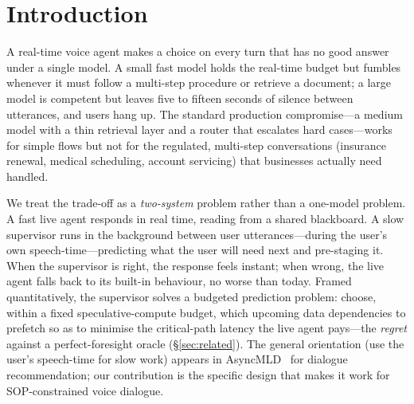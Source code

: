 \documentclass[10pt,twocolumn]{article}
\begin{document}
\section{Introduction}

A real-time voice agent makes a choice on every turn that has no good answer under a single model. A small fast model holds the real-time budget but fumbles whenever it must follow a multi-step procedure or retrieve a document; a large model is competent but leaves five to fifteen seconds of silence between utterances, and users hang up. The standard production compromise---a medium model with a thin retrieval layer and a router that escalates hard cases---works for simple flows but not for the regulated, multi-step conversations (insurance renewal, medical scheduling, account servicing) that businesses actually need handled.

We treat the trade-off as a \emph{two-system} problem rather than a one-model problem. A fast live agent responds in real time, reading from a shared blackboard. A slow supervisor runs in the background between user utterances---during the user's own speech-time---predicting what the user will need next and pre-staging it. When the supervisor is right, the response feels instant; when wrong, the live agent falls back to its built-in behaviour, no worse than today. Framed quantitatively, the supervisor solves a budgeted prediction problem: choose, within a fixed speculative-compute budget, which upcoming data dependencies to prefetch so as to minimise the critical-path latency the live agent pays---the \emph{regret} against a perfect-foresight oracle (\S\ref{sec:related}). The general orientation (use the user's speech-time for slow work) appears in AsyncMLD~\cite{asyncmld2023} for dialogue recommendation; our contribution is the specific design that makes it work for SOP-constrained voice dialogue.
\end{document}
